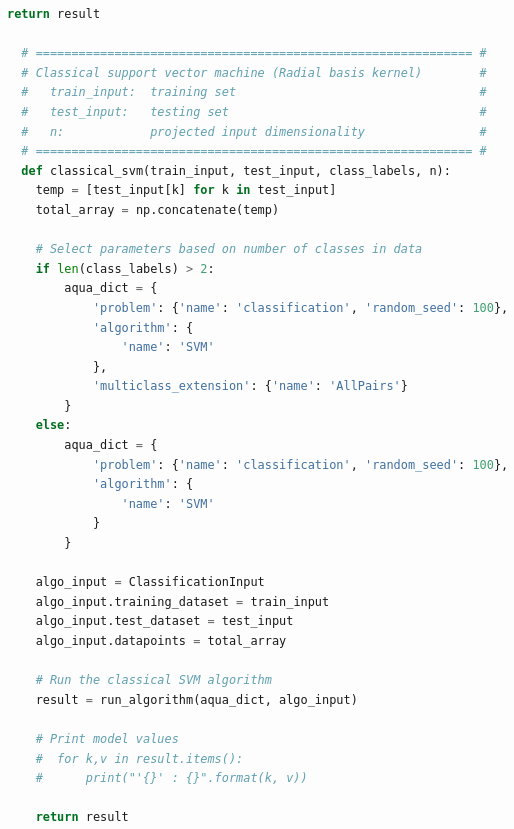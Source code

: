 \documentclass{article}
\begin{document}
\begin{lstlisting}[language=Python]
    return result

  # ============================================================= #
  # Classical support vector machine (Radial basis kernel)        #
  #   train_input:  training set                                  #
  #   test_input:   testing set                                   #
  #   n:            projected input dimensionality                #
  # ============================================================= #
  def classical_svm(train_input, test_input, class_labels, n):
    temp = [test_input[k] for k in test_input]
    total_array = np.concatenate(temp)

    # Select parameters based on number of classes in data
    if len(class_labels) > 2:
        aqua_dict = {
            'problem': {'name': 'classification', 'random_seed': 100},
            'algorithm': {
                'name': 'SVM'
            },
            'multiclass_extension': {'name': 'AllPairs'}
        }
    else:
        aqua_dict = {
            'problem': {'name': 'classification', 'random_seed': 100},
            'algorithm': {
                'name': 'SVM'
            }
        }

    algo_input = ClassificationInput
    algo_input.training_dataset = train_input
    algo_input.test_dataset = test_input
    algo_input.datapoints = total_array

    # Run the classical SVM algorithm
    result = run_algorithm(aqua_dict, algo_input)

    # Print model values
    #  for k,v in result.items():
    #      print("'{}' : {}".format(k, v))

    return result
  \end{lstlisting}
\end{document}
